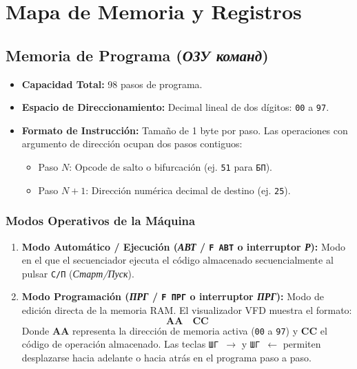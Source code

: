 \documentclass[11pt,a4paper]{article}
\begin{document}
\newpage

\section{Mapa de Memoria y Registros}

\subsection{Memoria de Programa (\textit{ОЗУ команд})}
\begin{itemize}
    \item \textbf{Capacidad Total:} 98 pasos de programa.
    \item \textbf{Espacio de Direccionamiento:} Decimal lineal de dos dígitos: \texttt{00} a \texttt{97}.
    \item \textbf{Formato de Instrucción:} Tamaño de 1 byte por paso. Las operaciones con argumento de dirección ocupan dos pasos contiguos:
    \begin{itemize}
        \item Paso $N$: Opcode de salto o bifurcación (ej. \texttt{51} para \texttt{БП}).
        \item Paso $N+1$: Dirección numérica decimal de destino (ej. \texttt{25}).
    \end{itemize}
\end{itemize}

\subsubsection{Modos Operativos de la Máquina}
\begin{enumerate}
    \item \textbf{Modo Automático / Ejecución (\textit{АВТ} / \texttt{F ABT} o interruptor \textit{Р}):}
    Modo en el que el secuenciador ejecuta el código almacenado secuencialmente al pulsar \texttt{С/П} (\textit{Старт/Пуск}).
    \item \textbf{Modo Programación (\textit{ПРГ} / \texttt{F ПРГ} o interruptor \textit{ПРГ}):}
    Modo de edición directa de la memoria RAM. El visualizador VFD muestra el formato:
    \[
    \mathbf{AA \quad CC}
    \]
    Donde $\mathbf{AA}$ representa la dirección de memoria activa (\texttt{00} a \texttt{97}) y $\mathbf{CC}$ el código de operación almacenado. Las teclas \texttt{ШГ $\rightarrow$} y \texttt{ШГ $\leftarrow$} permiten desplazarse hacia adelante o hacia atrás en el programa paso a paso.
\end{enumerate}
\end{document}
